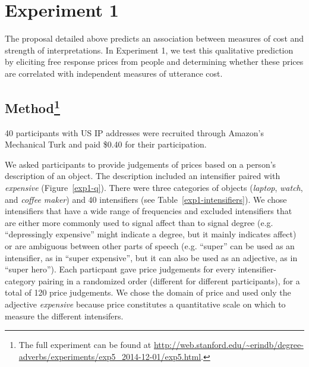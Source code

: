 \documentclass[10pt,letterpaper]{article}
\newcommand{\w}[1]{\emph{#1}}
\newcommand{\todo}[1]{{\color{red}#1}}
\begin{document}
\section{Experiment 1}

The proposal detailed above predicts an association between measures of cost and strength of interpretations. In Experiment 1, we test this qualitative prediction %
by eliciting free response prices from people and determining whether these prices are correlated with independent measures of utterance cost.

\subsection{Method\footnote{The full experiment can be found at \url{http://web.stanford.edu/~erindb/degree-adverbs/experiments/exp5_2014-12-01/exp5.html}.}}

40 participants with US IP addresses were recruited through Amazon's Mechanical Turk and paid \$0.40 for their participation.

We asked participants to provide judgements of prices based on a person's description of an object. The description included an intensifier paired with \w{expensive} (Figure~\ref{exp1-q}).
There were three categories of objects (\emph{laptop}, \emph{watch}, and \emph{coffee maker}) and 40 intensifiers (see Table~\ref{exp1-intensifiers}).
We chose intensifiers that have a wide range of frequencies and excluded intensifiers that are either more commonly used to signal affect than to signal degree (e.g. ``depressingly expensive'' might indicate a degree, but it mainly indicates affect) or are ambiguous between other parts of speech (e.g. ``super'' can be used as an intensifier, as in ``super expensive'', but it can also be used as an adjective, as in ``super hero'').
Each particpant gave price judgements for every intensifier-category pairing in a randomized order (different for different participants), for a total of 120 price judgements.
We chose the domain of price and used only the adjective \w{expensive} because price constitutes a quantitative scale on which to measure the different intensifers.%
\end{document}
